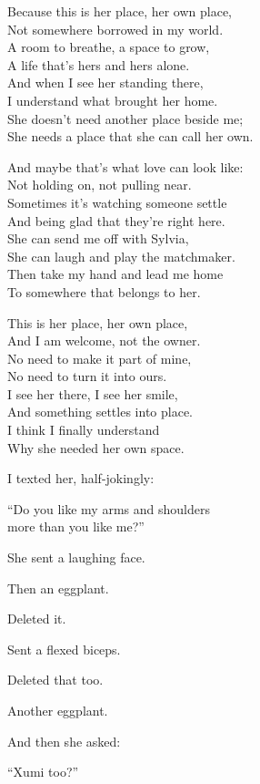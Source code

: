 \begin{lyrics}
Because this is her place, her own place,\\
Not somewhere borrowed in my world.\\
A room to breathe, a space to grow,\\
A life that's hers and hers alone.\\
And when I see her standing there,\\
I understand what brought her home.\\
She doesn't need another place beside me;\\
She needs a place that she can call her own.

And maybe that's what love can look like:\\
Not holding on, not pulling near.\\
Sometimes it's watching someone settle\\
And being glad that they're right here.\\
She can send me off with Sylvia,\\
She can laugh and play the matchmaker.\\
Then take my hand and lead me home\\
To somewhere that belongs to her.

This is her place, her own place,\\
And I am welcome, not the owner.\\
No need to make it part of mine,\\
No need to turn it into ours.\\
I see her there, I see her smile,\\
And something settles into place.\\
I think I finally understand\\
Why she needed her own space.

I texted her, half-jokingly:

“Do you like my arms and shoulders\\
more than you like me?”

She sent a laughing face.

Then an eggplant.

Deleted it.

Sent a flexed biceps.

Deleted that too.

Another eggplant.

And then she asked:

“Xumi too?”
\end{lyrics}

